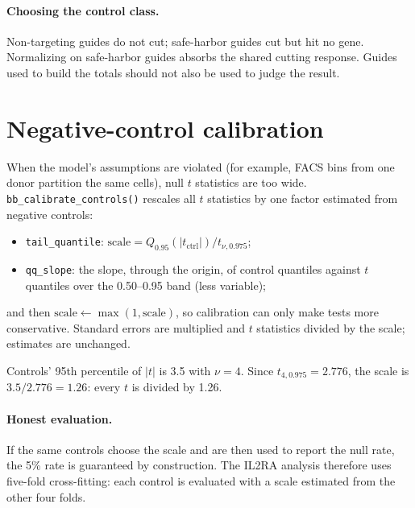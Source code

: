 \documentclass[11pt]{article}
\begin{document}
\paragraph{Choosing the control class.} Non-targeting guides do not cut;
safe-harbor guides cut but hit no gene.  Normalizing on safe-harbor guides
absorbs the shared cutting response.  Guides used to build the totals should
not also be used to judge the result.

\section{Negative-control calibration}

When the model's assumptions are violated (for example, FACS bins from one
donor partition the same cells), null $t$ statistics are too wide.
\texttt{bb\_calibrate\_controls()} rescales all $t$ statistics by one factor
estimated from negative controls:
\begin{itemize}[itemsep=1pt]
\item \texttt{tail\_quantile}: $\text{scale}=Q_{0.95}(|t_{\text{ctrl}}|)/t_{\nu,0.975}$;
\item \texttt{qq\_slope}: the slope, through the origin, of control quantiles
against $t$ quantiles over the 0.50--0.95 band (less variable);
\end{itemize}
and then $\text{scale}\leftarrow\max(1,\text{scale})$, so calibration can only
make tests more conservative.  Standard errors are multiplied and $t$
statistics divided by the scale; estimates are unchanged.

\begin{example}
Controls' 95th percentile of $|t|$ is 3.5 with $\nu=4$.  Since
$t_{4,0.975}=2.776$, the scale is $3.5/2.776=1.26$: every $t$ is divided by
1.26.
\end{example}

\paragraph{Honest evaluation.} If the same controls choose the scale and are
then used to report the null rate, the 5\% rate is guaranteed by construction.
The IL2RA analysis therefore uses five-fold cross-fitting: each control is
evaluated with a scale estimated from the other four folds.

\end{document}
